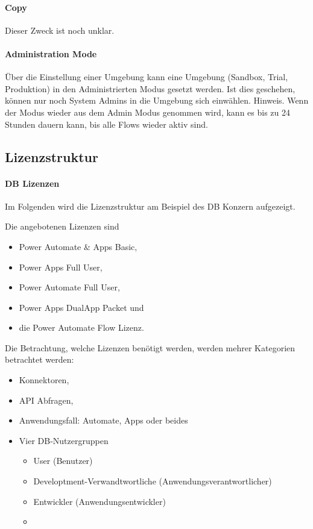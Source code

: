 \paragraph*{Copy \Env}
Dieser Zweck ist noch unklar.

\paragraph*{Administration Mode}
Über die Einstellung einer Umgebung kann eine Umgebung (Sandbox, Trial, Produktion) in den Administrierten Modus gesetzt werden. Ist dies geschehen, können nur noch System Admins in die Umgebung sich einwählen. Hinweis. Wenn der Modus wieder aus dem Admin Modus genommen wird, kann es bis zu 24 Stunden dauern kann, bis alle Flows wieder aktiv sind.


\subsection{Lizenzstruktur}
\paragraph{DB Lizenzen}
Im Folgenden wird die Lizenzstruktur am Beispiel des DB Konzern aufgezeigt.

Die angebotenen Lizenzen sind
\begin{itemize}
	\item Power Automate $\&$ Apps Basic,
	\item Power Apps Full User,
	\item Power Automate Full User,
	\item Power Apps DualApp Packet und
	\item die Power Automate Flow Lizenz.
\end{itemize}

Die Betrachtung, welche Lizenzen benötigt werden, werden mehrer Kategorien betrachtet werden:
\begin{itemize}
	\item Konnektoren,
	\item \gls{API} Abfragen,
	\item Anwendungsfall: Automate, Apps oder beides
	\item Vier DB-Nutzergruppen
		\begin{itemize}
			\item User (Benutzer)
			\item Developtment-Verwandtwortliche (Anwendungsverantwortlicher)
			\item Entwickler (Anwendungsentwickler)
			\item 
		\end{itemize} 
\end{itemize}

